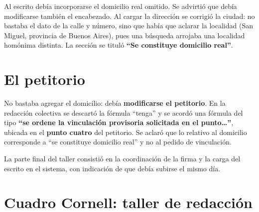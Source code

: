 \documentclass[12pt,oneside]{book}
\begin{document}
Al escrito debía incorporarse el domicilio real omitido. Se advirtió que debía modificarse también el encabezado. Al cargar la dirección se corrigió la ciudad: no bastaba el dato de la calle y número, sino que había que aclarar la localidad (San Miguel, provincia de Buenos Aires), pues una búsqueda arrojaba una localidad homónima distinta. La sección se tituló \textbf{``Se constituye domicilio real''}.


\section{El petitorio}

No bastaba agregar el domicilio: debía \textbf{modificarse el petitorio}. En la redacción colectiva se descartó la fórmula ``tenga'' y se acordó una fórmula del tipo \textbf{``se ordene la vinculación provisoria solicitada en el punto\ldots''}, ubicada en el \textbf{punto cuatro} del petitorio. Se aclaró que lo relativo al domicilio corresponde a ``se constituye domicilio real'' y no al pedido de vinculación.

\begin{note}
La parte final del taller consistió en la coordinación de la firma y la carga del escrito en el sistema, con indicación de que debía subirse el mismo día.
\end{note}

\section{Cuadro Cornell: taller de redacción}
\end{document}
